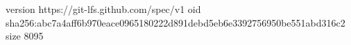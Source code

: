 version https://git-lfs.github.com/spec/v1
oid sha256:abc7a4aff6b970eace0965180222d891debd5eb6e3392756950be551abd316c2
size 8095
